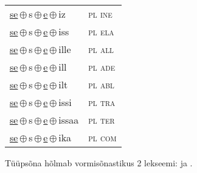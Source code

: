 \begin{minipage}{\textwidth}
\begin{sideways}
\begin{tabular}{l l}
\underline{se}\,$\oplus$\,s\,$\oplus$\,\underline{e}\,$\oplus$\,iz & \textsc{ pl ine } \\
\underline{se}\,$\oplus$\,s\,$\oplus$\,\underline{e}\,$\oplus$\,iss & \textsc{ pl ela } \\
\underline{se}\,$\oplus$\,s\,$\oplus$\,\underline{e}\,$\oplus$\,ille & \textsc{ pl all } \\
\underline{se}\,$\oplus$\,s\,$\oplus$\,\underline{e}\,$\oplus$\,ill & \textsc{ pl ade } \\
\underline{se}\,$\oplus$\,s\,$\oplus$\,\underline{e}\,$\oplus$\,ilt & \textsc{ pl abl } \\
\underline{se}\,$\oplus$\,s\,$\oplus$\,\underline{e}\,$\oplus$\,issi & \textsc{ pl tra } \\
\underline{se}\,$\oplus$\,s\,$\oplus$\,\underline{e}\,$\oplus$\,issaa & \textsc{ pl ter } \\
\underline{se}\,$\oplus$\,s\,$\oplus$\,\underline{e}\,$\oplus$\,ika & \textsc{ pl com } \\
\end{tabular}
\end{sideways}
\label{tab:tüüpsõnamall-sese}

\end{minipage}

 
\vspace{1em}
\noindent Tüüpsõna hõlmab vormisõnastikus 2 lekseemi:  ja .
